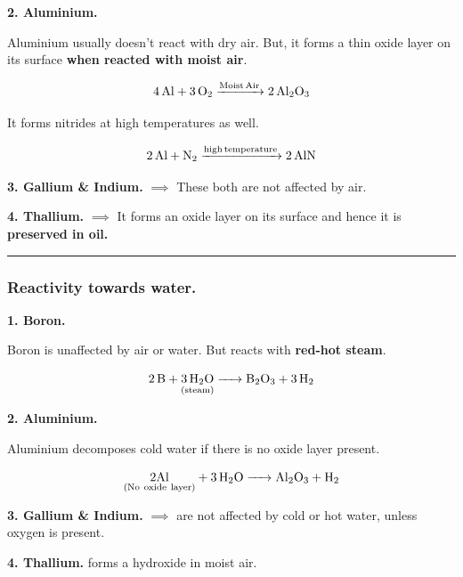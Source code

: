 \documentclass[twocolumn]{article}
\begin{document}
\begin{CJK*}{UTF8}{gbsn}
\vspace*{0.2in} 

\textbf{2. Aluminium.} 
\vspace*{0.1in} 

Aluminium usually doesn't react with dry air. But, it forms a thin oxide layer on its surface \textbf{when reacted with moist air}.  

\[
    \ce{ 4Al + 3O2 ->[Moist Air] 2Al2O3 } 
\]

It forms nitrides at high temperatures as well.  

\[
    \ce{  2Al + N2 ->[high temperature] 2AlN}
\]


\vspace*{0.2in} 

\textbf{3. Gallium \& Indium.} \(\implies\) These both are not affected by air. 

\vspace*{0.2in} 

\textbf{4. Thallium.}  \(\implies\) It forms an oxide layer on its surface and hence it is \textbf{preserved in oil.}  

\vspace*{0.1in} 

\hrule

\subsubsection*{Reactivity towards water.}

\textbf{1. Boron.} 

Boron is unaffected by air or water. But reacts with \textbf{red-hot steam}. 

\[
    \ce{ 2B + \underset{ (steam) }{ \ce{ 3H2O }  } -> B2O3 + 3H2 } 
\]

\vspace*{0.1in} 

\textbf{2. Aluminium.}

Aluminium decomposes cold water if there is no oxide layer present. 

\[
    \ce{ \underset{ (No\ oxide\ layer) }{ 2Al} + 3H2O -> Al2O3 + H2 } 
\]

\vspace*{0.1in} 

\textbf{3. Gallium \& Indium.} \(\implies\) are not affected by cold or hot water, unless oxygen is present. 

\vspace*{0.1in} 

\textbf{4. Thallium.} forms a hydroxide in moist air. 


\end{CJK*}
\end{document}
